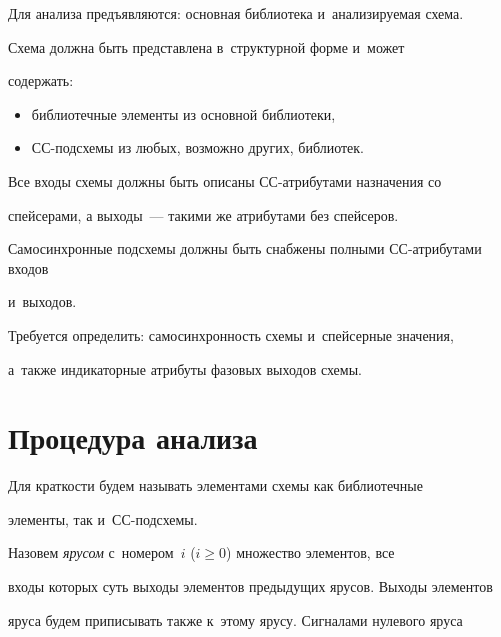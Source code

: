        


   Для анализа предъявляются: основная библиотека и~анализируемая схема.


   


   Схема должна быть представлена в~структурной форме и~может 


содержать:


   \begin{itemize}


   \item библиотечные элементы из основной библиотеки,


   \item СС-подсхемы из любых, возможно других, библиотек.


   \end{itemize}


   


   Все входы схемы должны быть описаны СС-атрибутами назначения со 


спейсерами, а выходы~--- такими же атрибутами без спейсеров.


   


   Самосинхронные подсхемы должны быть снабжены полными СС-атрибутами входов 


и~выходов.


   


   Требуется определить: самосинхронность схемы и~спейсерные значения, 


а~также индикаторные атрибуты фазовых выходов схемы.


\section{Процедура анализа}


       


   Для краткости будем называть элементами схемы как библиотечные 


элементы, так и~СС-подсхемы.


   


   Назовем \textit{ярусом} с~номером~$i$ ($i\geq 0$) множество элементов, все 


входы которых суть выходы элементов предыдущих ярусов. Выходы элементов 


яруса будем приписывать также к~этому ярусу. Сигналами нулевого яруса 


